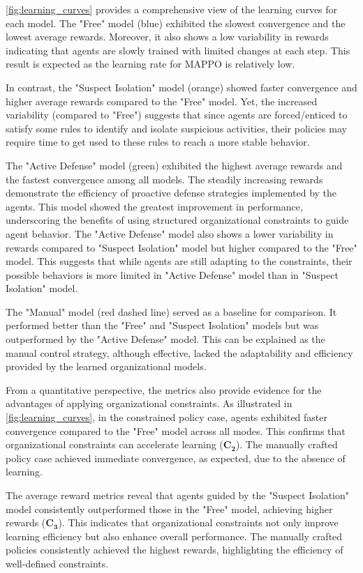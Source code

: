 \autoref{fig:learning_curves} provides a comprehensive view of the learning curves for each model. The "Free" model (blue) exhibited the slowest convergence and the lowest average rewards. Moreover, it also shows a low variability in rewards indicating that agents are slowly trained with limited changes at each step. This result is expected as the learning rate for MAPPO is relatively low.

In contrast, the "Suspect Isolation" model (orange) showed faster convergence and higher average rewards compared to the "Free" model. Yet, the increased variability (compared to "Free") suggests that since agents are forced/enticed to satisfy some rules to identify and isolate suspicious activities, their policies may require time to get used to these rules to reach a more stable behavior.

The "Active Defense" model (green) exhibited the highest average rewards and the fastest convergence among all models. The steadily increasing rewards demonstrate the efficiency of proactive defense strategies implemented by the agents. This model showed the greatest improvement in performance, underscoring the benefits of using structured organizational constraints to guide agent behavior. The "Active Defense" model also shows a lower variability in rewards compared to "Suspect Isolation" model but higher compared to the "Free" model. This suggests that while agents are still adapting to the constraints, their possible behaviors is more limited in "Active Defense" model than in "Suspect Isolation" model.

The "Manual" model (red dashed line) served as a baseline for comparison. It performed better than the "Free" and "Suspect Isolation" models but was outperformed by the "Active Defense" model. This can be explained as the manual control strategy, although effective, lacked the adaptability and efficiency provided by the learned organizational models.

From a quantitative perspective, the metrics also provide evidence for the advantages of applying organizational constraints. As illustrated in \autoref{fig:learning_curves}, in the constrained policy case, agents exhibited faster convergence compared to the "Free" model across all modes. This confirms that organizational constraints can accelerate learning ($\mathbf{C_2}$). The manually crafted policy case achieved immediate convergence, as expected, due to the absence of learning.

The average reward metrics reveal that agents guided by the "Suspect Isolation" model consistently outperformed those in the "Free" model, achieving higher rewards ($\mathbf{C_3}$). This indicates that organizational constraints not only improve learning efficiency but also enhance overall performance. The manually crafted policies consistently achieved the highest rewards, highlighting the efficiency of well-defined constraints.


